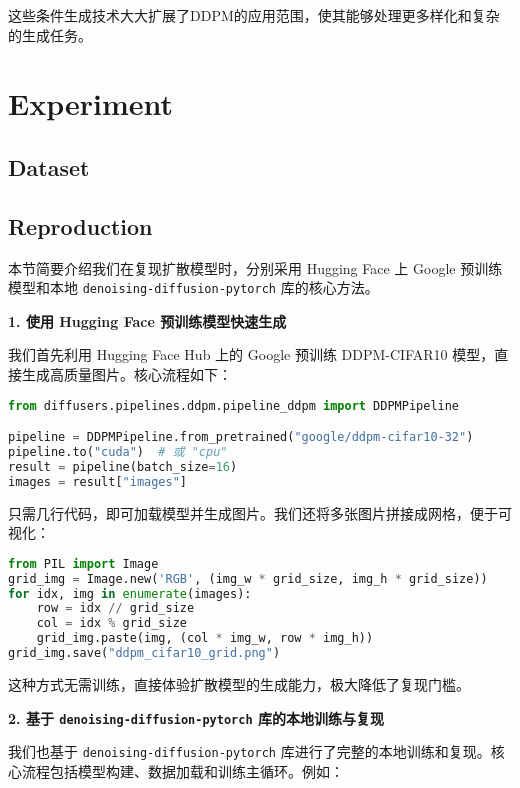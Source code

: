 \documentclass{ctexart}
\begin{document}
\noindent
这些条件生成技术大大扩展了DDPM的应用范围，使其能够处理更多样化和复杂的生成任务。

\section{Experiment}

\subsection{Dataset}


\subsection{Reproduction}

本节简要介绍我们在复现扩散模型时，分别采用 Hugging Face 上 Google 预训练模型和本地 \texttt{denoising-diffusion-pytorch} 库的核心方法。

\vspace{0.5em}
\noindent
\textbf{1. 使用 Hugging Face 预训练模型快速生成}

我们首先利用 Hugging Face Hub 上的 Google 预训练 DDPM-CIFAR10 模型，直接生成高质量图片。核心流程如下：

\begin{lstlisting}[language=python]
from diffusers.pipelines.ddpm.pipeline_ddpm import DDPMPipeline

pipeline = DDPMPipeline.from_pretrained("google/ddpm-cifar10-32")
pipeline.to("cuda")  # 或 "cpu"
result = pipeline(batch_size=16)
images = result["images"]
\end{lstlisting}

只需几行代码，即可加载模型并生成图片。我们还将多张图片拼接成网格，便于可视化：

\begin{lstlisting}[language=python]
from PIL import Image
grid_img = Image.new('RGB', (img_w * grid_size, img_h * grid_size))
for idx, img in enumerate(images):
    row = idx // grid_size
    col = idx % grid_size
    grid_img.paste(img, (col * img_w, row * img_h))
grid_img.save("ddpm_cifar10_grid.png")
\end{lstlisting}

这种方式无需训练，直接体验扩散模型的生成能力，极大降低了复现门槛。

\vspace{0.5em}
\noindent
\textbf{2. 基于 \texttt{denoising-diffusion-pytorch} 库的本地训练与复现}

我们也基于 \texttt{denoising-diffusion-pytorch} 库进行了完整的本地训练和复现。核心流程包括模型构建、数据加载和训练主循环。例如：
\end{document}
